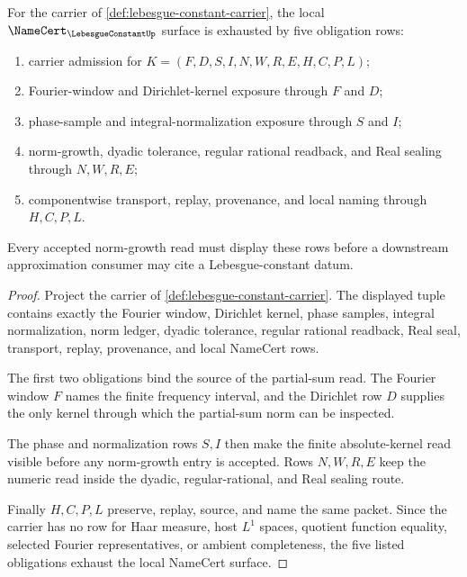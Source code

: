 \begin{theorem}
\label{thm:lebesgue-constant-namecert-obligations}
For the carrier of \autoref{def:lebesgue-constant-carrier}, the local $\NameCert_{\LebesgueConstantUp}$ surface is exhausted by five obligation rows:
\begin{enumerate}
\item carrier admission for $K=(F,D,S,I,N,W,R,E,H,C,P,L)$;
\item Fourier-window and Dirichlet-kernel exposure through $F$ and $D$;
\item phase-sample and integral-normalization exposure through $S$ and $I$;
\item norm-growth, dyadic tolerance, regular rational readback, and Real sealing through $N,W,R,E$;
\item componentwise transport, replay, provenance, and local naming through $H,C,P,L$.
\end{enumerate}
Every accepted norm-growth read must display these rows before a downstream approximation consumer may cite a Lebesgue-constant datum.
\end{theorem}
\begin{proof}
Project the carrier of \autoref{def:lebesgue-constant-carrier}. The displayed tuple contains exactly the Fourier window, Dirichlet kernel, phase samples, integral normalization, norm ledger, dyadic tolerance, regular rational readback, Real seal, transport, replay, provenance, and local NameCert rows.

The first two obligations bind the source of the partial-sum read. The Fourier window $F$ names the finite frequency interval, and the Dirichlet row $D$ supplies the only kernel through which the partial-sum norm can be inspected.

The phase and normalization rows $S,I$ then make the finite absolute-kernel read visible before any norm-growth entry is accepted. Rows $N,W,R,E$ keep the numeric read inside the dyadic, regular-rational, and Real sealing route.

Finally $H,C,P,L$ preserve, replay, source, and name the same packet. Since the carrier has no row for Haar measure, host $L^{1}$ spaces, quotient function equality, selected Fourier representatives, or ambient completeness, the five listed obligations exhaust the local NameCert surface.
\end{proof}

